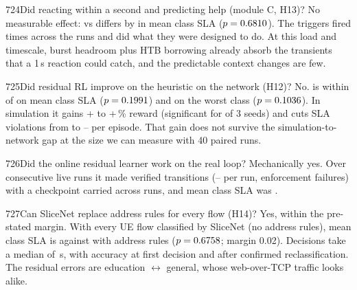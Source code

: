 \begin{qa}{724}{Did reacting within a second and predicting help (module C, H13)?}
No measurable effect:  vs  differs by \NQDiffQosAwareMeanSla{} in mean class SLA
($p=0.6810$). The triggers fired \NQReactions{} times across the \NQRuns{} runs and did what they were
designed to do. At this load and timescale, burst headroom plus HTB borrowing already absorb the transients that a 1\,s
reaction could catch, and the predictable context changes are few.
\end{qa}

\begin{qa}{725}{Did residual RL improve on the heuristic on the network (H12)?}
No.  is within \NQDiffResidualMeanSla{} of  on mean class SLA
($p=0.1991$) and \NQDiffResidualMinSla{} on the worst class ($p=0.1036$). In simulation it
gains +\NResRelMin{} to +\NResRelMax\,\% reward (significant for \NResSigSeeds{} of 3 seeds) and cuts SLA violations
from \NResViolHeuristic{} to \NResViolMin--\NResViolMax{} per episode. That gain does not survive the
simulation-to-network gap at the size we can measure with 40 paired runs.
\end{qa}

\begin{qa}{726}{Did the online residual learner work on the real loop?}
Mechanically yes. Over \NQOnlineRuns{} consecutive live runs it made \NQOnlineTransitions{} verified transitions
(\NQOnlineTransMin--\NQOnlineTransMax{} per run, \NQOnlineFailed{} enforcement failures) with a checkpoint carried
across runs, and mean class SLA was \NQOnlineMeanSla.
\end{qa}

\begin{qa}{727}{Can SliceNet replace address rules for every flow (H14)?}
Yes, within the pre-stated margin. With every UE flow classified by SliceNet (no address rules), mean class SLA is
\NQSnAllMeanSla{} against \NQSnHostMeanSla{} with address rules ($p=0.6758$; margin 0.02). Decisions take a median
of \NQSnDecisionS\,s, with \NQSnAccuracy{} accuracy at first decision and \NQSnFinalAccuracy{} after confirmed
reclassification. The residual errors are education $\leftrightarrow$ general, whose web-over-TCP traffic looks alike.
\end{qa}

